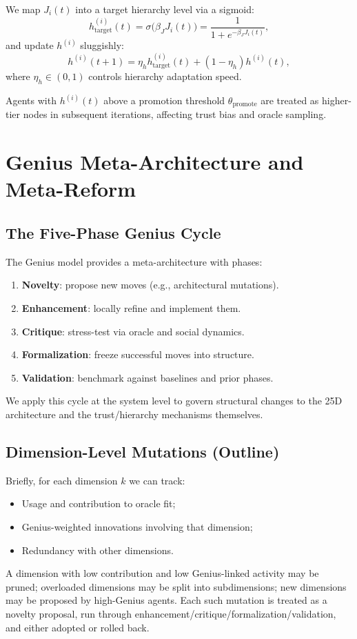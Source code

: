 \documentclass[11pt]{article}
\begin{document}
We map $J_i(t)$ into a target hierarchy level via a sigmoid:
\[
  h_{\text{target}}^{(i)}(t)
  = \sigma\bigl( \beta_J J_i(t) \bigr)
  = \frac{1}{1 + e^{-\beta_J J_i(t)}},
\]
and update $h^{(i)}$ sluggishly:
\[
  h^{(i)}(t+1)
  = \eta_h h_{\text{target}}^{(i)}(t)
    + (1-\eta_h) h^{(i)}(t),
\]
where $\eta_h \in (0,1)$ controls hierarchy adaptation speed.

Agents with $h^{(i)}(t)$ above a promotion threshold $\theta_{\text{promote}}$
are treated as higher-tier nodes in subsequent iterations, affecting
trust bias and oracle sampling.

\section{Genius Meta-Architecture and Meta-Reform}

\subsection{The Five-Phase Genius Cycle}

The Genius model provides a meta-architecture with phases:
\begin{enumerate}[noitemsep]
  \item \textbf{Novelty}: propose new moves (e.g., architectural mutations).
  \item \textbf{Enhancement}: locally refine and implement them.
  \item \textbf{Critique}: stress-test via oracle and social dynamics.
  \item \textbf{Formalization}: freeze successful moves into structure.
  \item \textbf{Validation}: benchmark against baselines and prior phases.
\end{enumerate}

We apply this cycle at the system level to govern structural changes to
the 25D architecture and the trust/hierarchy mechanisms themselves.

\subsection{Dimension-Level Mutations (Outline)}

Briefly, for each dimension $k$ we can track:
\begin{itemize}[noitemsep]
  \item Usage and contribution to oracle fit;
  \item Genius-weighted innovations involving that dimension;
  \item Redundancy with other dimensions.
\end{itemize}
A dimension with low contribution and low Genius-linked activity may be
pruned; overloaded dimensions may be split into subdimensions; new
dimensions may be proposed by high-Genius agents.
Each such mutation is treated as a novelty proposal, run through
enhancement/critique/formalization/validation, and either adopted or
rolled back.
\end{document}
